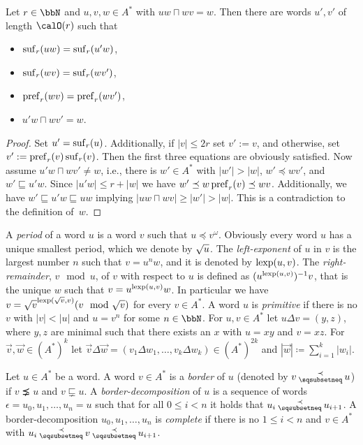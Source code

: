 \begin{lemma}\label{lem:short_ends_construction}
	Let $r\in\bbN$ and $u,v,w \in A^\ast$ with $uw\sqcap wv = w$. %
	Then there are words $u',v'$ of length $\calO(r)$ such that 
	\begin{itemize}
		\item $\operatorname{suf}_r(uw) = \operatorname{suf}_r(u'w)$,
		\item $\operatorname{suf}_r(wv) = \operatorname{suf}_r(wv')$,
		\item $\operatorname{pref}_r(wv) = \operatorname{pref}_r(wv')$,
		\item $u'w\sqcap wv' = w$.
	\end{itemize}
\end{lemma}
\begin{proof}
	Set $u'=\operatorname{suf}_r(u)$. Additionally, if $|v|\leq 2r$ set $v':=v$, and otherwise, set $v':=\operatorname{pref}_r(v)\operatorname{suf}_r(v)$. Then the first three equations are obviously satisfied. Now assume $u'w\sqcap wv'\neq w$, i.e., there is $w'\in A^*$ with $|w'|>|w|$, $w'\preceq wv'$, and $w'\sqsubseteq u'w$. Since $|u'w|\leq r+|w|$ we have $w'\preceq w\operatorname{pref}_r(v)\preceq wv$. Additionally, we have $w'\sqsubseteq u'w\sqsubseteq uw$ implying $|uw\sqcap wv|\geq|w'|>|w|$. This is a contradiction to the definition of~$w$.
\end{proof}

A \emph{period} of a word $u$ is a word $v$ such that $u \preceq v^\omega$. Obviously every word $u$ has a unique smallest period, which we denote by $\sqrt{u}$. The \emph{left-exponent} of $u$ in $v$ is the largest number $n$ such that $v= u^nw$, and it is denoted by $\operatorname{lexp}(u,v)$. The \emph{right-remainder}, $v\mod u$,  of $v$ with respect to $u$ is defined as $(u^{\operatorname{lexp}(u,v)})^{-1}v$, that is the unique $w$ such that $v= u^{\operatorname{lexp}(u,v)}w$.  In particular we have $v= \root{v}^{\lexp(\root{v}, v)}(v \mod \root{v})$ for every $v\in A^\ast$. A word $u$ is \emph{primitive} if there is no $v$ with
$|v| < |u|$ and $u = v^n$ for some $n\in\bbN$.
For $u,v\in A^\ast$ let $u\Delta v = (y,z)$, where $y,z$ are minimal such that there exists an $x$ with $u=xy$ and $v=xz$. For $\vec{v}, \vec{w}\in(A^\ast)^k$ let 
$\vec{v}\Delta\vec{w} = (v_1\Delta w_1,\ldots, v_k\Delta w_k) \in (A^\ast)^{2k}$ and $|\vec{w}| \coloneq \sum_{i=1}^{k}|w_i|$. 

\begin{definition}
	Let $u\in A^\ast$ be a word. A word $v\in A^*$ is a \emph{border} of $u$ (denoted by $v\presuf u$) if $v \precneq u$ and $v \sqsubsetneq u$. A \emph{border-decomposition} of $u$ is a sequence of words $\epsilon = u_0,u_1,\ldots, u_n = u$ such that for all $0\leq i < n$ it holds that
	$u_i \presuf u_{i+1}$. A border-decomposition $u_0,u_1,\ldots, u_n $ is \emph{complete} if there is no $1\leq i< n$ and $v\in A^\ast$ with $u_i \presuf v \presuf u_{i+1}$.
\end{definition}

